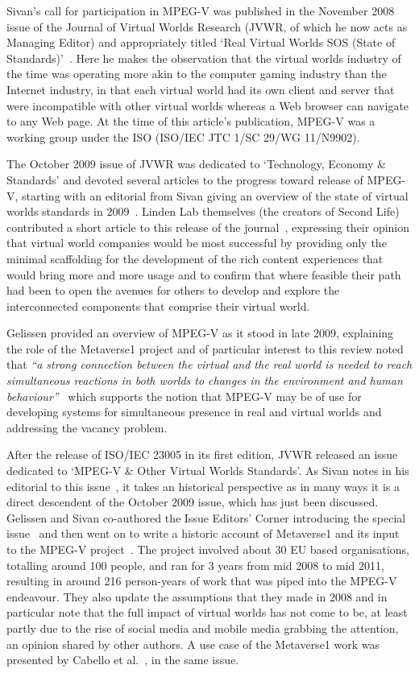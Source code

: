 Sivan's call for participation in MPEG-V was published in the November 2008 issue of the Journal of Virtual Worlds Research (JVWR, of which he now acts as Managing Editor) and appropriately titled `Real Virtual Worlds SOS (State of Standards)'~\cite{Sivan2008}. Here he makes the observation that the virtual worlds industry of the time was operating more akin to the computer gaming industry than the Internet industry, in that each virtual world had its own client and server that were incompatible with other virtual worlds whereas a Web browser can navigate to any Web page. At the time of this article's publication, MPEG-V was a working group under the ISO (ISO/IEC JTC 1/SC 29/WG 11/N9902).

The October 2009 issue of JVWR was dedicated to `Technology, Economy \& Standards' and devoted several articles to the progress toward release of MPEG-V, starting with an editorial from Sivan giving an overview of the state of virtual worlds standards in 2009~\cite{Sivan2009}. Linden Lab themselves (the creators of Second Life) contributed a short article to this release of the journal~\cite{Rosendale2009}, expressing their opinion that virtual world companies would be most successful by providing only the minimal scaffolding for the development of the rich content experiences that would bring more and more usage and to confirm that where feasible their path had been to open the avenues for others to develop and explore the interconnected components that comprise their virtual world.

Gelissen provided an overview of MPEG-V as it stood in late 2009, explaining the role of the Metaverse1 project and of particular interest to this review noted that \textit{``a strong connection between the virtual and the real world is needed to reach simultaneous reactions in both worlds to changes in the environment and human behaviour''}~\cite{Gelissen2009} which supports the notion that MPEG-V may be of use for developing systems for simultaneous presence in real and virtual worlds and addressing the vacancy problem.

After the release of ISO/IEC 23005 in its first edition, JVWR released an issue dedicated to `MPEG-V \& Other Virtual Worlds Standards'. As Sivan notes in his editorial to this issue~\cite{Sivan2011}, it takes an historical perspective as in many ways it is a direct descendent of the October 2009 issue, which has just  been discussed. Gelissen and Sivan co-authored the Issue Editors' Corner introducing the special issue~\cite{Gelissen2011} and then went on to write a historic account of Metaverse1 and its input to the MPEG-V project~\cite{Gelissen2011a}. The project involved about 30 EU based organisations, totalling around 100 people, and ran for 3 years from mid 2008 to mid 2011, resulting in around 216 person-years of work that was piped into the MPEG-V endeavour. They also update the assumptions that they made in 2008 and in particular note that the full impact of virtual worlds has not come to be, at least partly due to the rise of social media and mobile media grabbing the attention, an opinion shared by other authors. A use case of the Metaverse1 work was presented by Cabello et al.~\cite{Cabello2011}, in the same issue.

